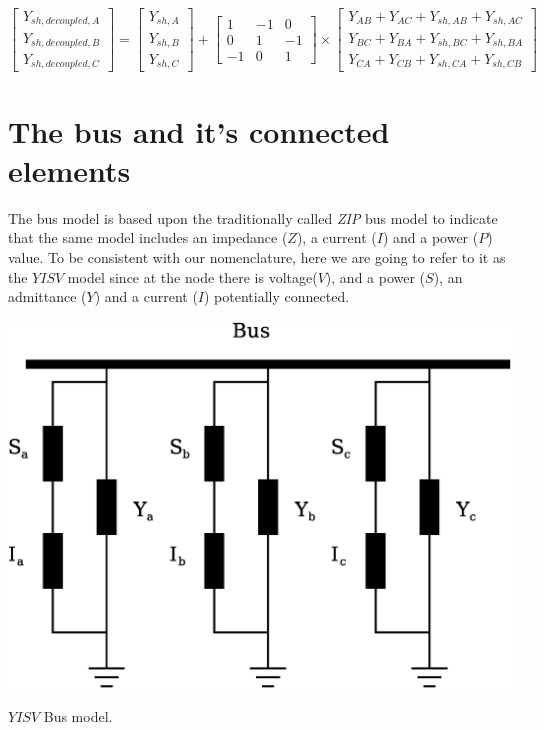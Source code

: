 \documentclass[a4paper,twoside,fleqn]{tufte-book}
\begin{document}
\begin{equation}
\left[ \begin{array}{c}
Y_{sh, decoupled, A} \\
Y_{sh, decoupled, B} \\
Y_{sh, decoupled, C}
\end{array} \right] = \left[ \begin{array}{c}
Y_{sh,A} \\
Y_{sh,B} \\
Y_{sh,C}
\end{array} \right] + \left[ \begin{array}{ccc}
1 & -1 & 0 \\
0 & 1 & -1 \\
-1 & 0 & 1
\end{array} \right] \times \left[ \begin{array}{c}
Y_{AB} + Y_{AC} + Y_{sh,AB} + Y_{sh,AC} \\
Y_{BC} + Y_{BA} + Y_{sh,BC} + Y_{sh,BA}\\
Y_{CA} + Y_{CB} + Y_{sh,CA} + Y_{sh,CB}
\end{array} \right]
\end{equation}



\chapter{The bus and it's connected elements}

The bus model is based upon the traditionally called \textit{ZIP} bus model to indicate that the same model includes an impedance ($Z$), a current ($I$) and a power ($P$) value. To be consistent with our nomenclature, here we are going to refer to it as the $YISV$ model since at the node there is voltage($V$), and a power ($S$), an admittance ($Y$) and a current ($I$) potentially connected.


\begin{marginfigure}
	\includegraphics[width=0.99\linewidth]{img/NodeElements.eps}
	\caption{$YISV$ Bus model.}
	\label{bus_model}
\end{marginfigure}
\end{document}
